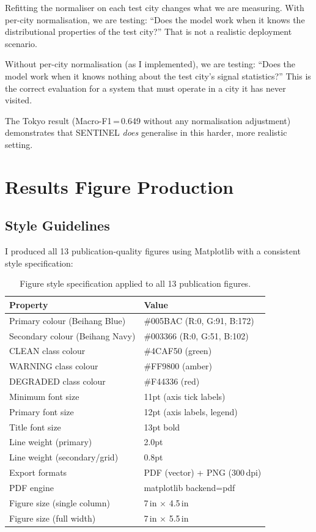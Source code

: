 \documentclass[12pt,a4paper]{article}
\begin{document}
Refitting the normaliser on each test city changes what we are measuring.
With per-city normalisation, we are testing: ``Does the model work when it knows the
distributional properties of the test city?''
That is not a realistic deployment scenario.

Without per-city normalisation (as I implemented), we are testing: ``Does the model
work when it knows nothing about the test city's signal statistics?''
This is the correct evaluation for a system that must operate in a city it has never
visited.

The Tokyo result (Macro-F1\,=\,0.649 without any normalisation adjustment) demonstrates
that SENTINEL \emph{does} generalise in this harder, more realistic setting.

\newpage
\section{Results Figure Production}

\subsection{Style Guidelines}

I produced all 13 publication-quality figures using Matplotlib with a consistent
style specification:

\begin{table}[H]
  \centering
  \caption{Figure style specification applied to all 13 publication figures.}
  \begin{tabular}{ll}
    \toprule
    \textbf{Property} & \textbf{Value} \\
    \midrule
    Primary colour (Beihang Blue) & \#005BAC (R:0, G:91, B:172) \\
    Secondary colour (Beihang Navy) & \#003366 (R:0, G:51, B:102) \\
    CLEAN class colour  & \#4CAF50 (green) \\
    WARNING class colour & \#FF9800 (amber) \\
    DEGRADED class colour & \#F44336 (red) \\
    Minimum font size    & 11pt (axis tick labels) \\
    Primary font size    & 12pt (axis labels, legend) \\
    Title font size      & 13pt bold \\
    Line weight (primary) & 2.0pt \\
    Line weight (secondary/grid) & 0.8pt \\
    Export formats       & PDF (vector) + PNG (300\,dpi) \\
    PDF engine           & matplotlib backend=pdf \\
    Figure size (single column) & 7\,in $\times$ 4.5\,in \\
    Figure size (full width) & 7\,in $\times$ 5.5\,in \\
    \bottomrule
  \end{tabular}
\end{table}
\end{document}
